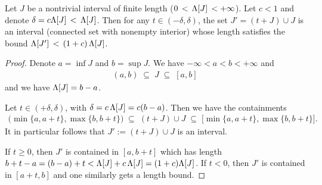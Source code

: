 \begin{lemma}
  \label{lem:overlapping-union-interval-copies}
  Let $J$ be a nontrivial interval of finite length ($0 \, < \, \Lambda[J] \, < +\infty$).
  Let $c < 1$ and denote $\delta = c \Lambda[J] \, < \, \Lambda[J]$.
  Then for any $t \in (-\delta,\delta)$, the set
  $J' = (t+J) \cup J$ is an interval (connected set with nonempty interior)
  whose length satisfies the bound $\Lambda[J'] \, < \, (1+c) \, \Lambda[J]$.
\end{lemma}
\begin{proof}
  Denote $a = \inf J$ and $b = \sup J$. We have $-\infty < a < b < +\infty$ and
  \begin{align*}
    (a,b) \; \subseteq \; J \; \subseteq \; [a,b]
  \end{align*}
  and we have $\Lambda[J] = b - a$.

  Let $t \in (+\delta,\delta)$, with $\delta = c \, \Lambda[J] = c(b-a)$.
  Then we have the containments
  \begin{align*}
    \big( \min \{a,a+t\} , \max \{b,b+t\} \big)
      \; \subseteq \; (t+J) \cup J
      \; \subseteq \; \big[ \min \{a,a+t\} , \max \{b,b+t\} \big] .
  \end{align*}
  It in particular follows that $J' := (t+J) \cup J$ is an interval.

  If $t \ge 0$, then $J'$ is contained in
  $[a,b+t]$ which has length $b+t-a = (b-a) + t < \Lambda[J] + c \, \Lambda[J] = (1+c) \Lambda[J]$.
  If $t < 0$, then $J'$ is contained in $[a+t,b]$ and one similarly gets a length bound.
\end{proof}


